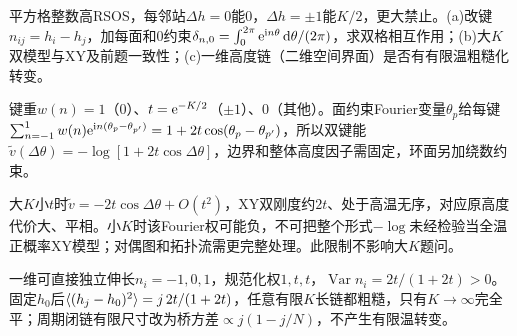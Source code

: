 \begin{exercise}[原题12(a)--(c)]\label{r:334-3-12}
平方格整数高RSOS，每邻站$\Delta h=0$能0，$\Delta h=\pm1$能$K/2$，更大禁止。(a)改键$n_{ij}=h_i-h_j$，加每面和0约束$\delta_{n,0}=\int_0^{2\pi}\mathrm e^{\mathrm i n\theta}\,\mathrm d\theta/(2\pi)$，求双格相互作用；(b)大$K$双模型与XY及前题一致性；(c)一维高度链（二维空间界面）是否有有限温粗糙化转变。
\end{exercise}
\begin{solution}
键重$w(n)=1$（0）、$t=\mathrm e^{-K/2}$（$\pm1$）、0（其他）。面约束Fourier变量$\theta_p$给每键$\sum_{n=-1}^1w(n)\mathrm e^{\mathrm i n(\theta_p-\theta_{p'})}=1+2t\cos(\theta_p-\theta_{p'})$，所以双键能$\widetilde v(\Delta\theta)=-\log[1+2t\cos\Delta\theta]$，边界和整体高度因子需固定，环面另加绕数约束。

大$K$小$t$时$\widetilde v=-2t\cos\Delta\theta+O(t^2)$，XY双刚度约$2t$、处于高温无序，对应原高度代价大、平相。小$K$时该Fourier权可能负，不可把整个形式$-\log$未经检验当全温正概率XY模型；对偶图和拓扑流需更完整处理。此限制不影响大$K$题问。

一维可直接独立伸长$n_i=-1,0,1$，规范化权$1,t,t$，$\operatorname{Var}n_i=2t/(1+2t)>0$。固定$h_0$后$\langle (h_j-h_0)^2\rangle=j\,2t/(1+2t)$，任意有限$K$长链都粗糙，只有$K\to\infty$完全平；周期闭链有限尺寸改为桥方差$\propto j(1-j/N)$，不产生有限温转变。
\end{solution}
